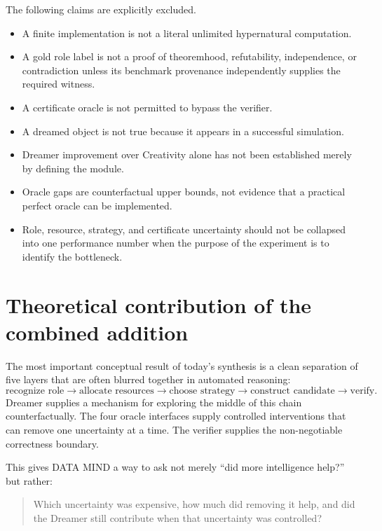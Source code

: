 \documentclass[11pt]{article}
\begin{document}
The following claims are explicitly excluded.

\begin{itemize}
\item A finite implementation is not a literal unlimited hypernatural computation.
\item A gold role label is not a proof of theoremhood, refutability, independence, or contradiction unless its benchmark provenance independently supplies the required witness.
\item A certificate oracle is not permitted to bypass the verifier.
\item A dreamed object is not true because it appears in a successful simulation.
\item Dreamer improvement over Creativity alone has not been established merely by defining the module.
\item Oracle gaps are counterfactual upper bounds, not evidence that a practical perfect oracle can be implemented.
\item Role, resource, strategy, and certificate uncertainty should not be collapsed into one performance number when the purpose of the experiment is to identify the bottleneck.
\end{itemize}

\section{Theoretical contribution of the combined addition}

The most important conceptual result of today's synthesis is a clean separation of five layers that are often blurred together in automated reasoning:
\begin{equation}
\boxed{
\text{recognize role}
\rightarrow
\text{allocate resources}
\rightarrow
\text{choose strategy}
\rightarrow
\text{construct candidate}
\rightarrow
\text{verify}.
}
\end{equation}
Dreamer supplies a mechanism for exploring the middle of this chain counterfactually. The four oracle interfaces supply controlled interventions that can remove one uncertainty at a time. The verifier supplies the non-negotiable correctness boundary.

This gives DATA MIND a way to ask not merely ``did more intelligence help?'' but rather:
\begin{quote}
Which uncertainty was expensive, how much did removing it help, and did the Dreamer still contribute when that uncertainty was controlled?
\end{quote}
\end{document}
